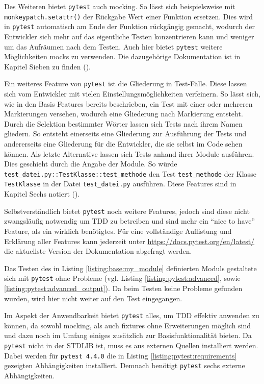 Des Weiteren bietet \lstinline{pytest} auch \gls{mock}ing. So lässt sich
beispielsweise mit \lstinline{monkeypatch.setattr()} der Rückgabe Wert einer
Funktion ersetzen. Dies wird in \lstinline{pytest} automatisch am Ende der
Funktion rückgängig gemacht, wodurch der Entwickler sich mehr auf das
eigentliche Testen konzentrieren kann und weniger um das Aufräumen nach dem
Testen. Auch hier bietet \lstinline{pytest} weitere Möglichkeiten \Glspl{mock}
zu verwenden. Die dazugehörige Dokumentation ist in Kapitel Sieben zu finden
(\cite{docs.pytest.org:4.4}).
\newline

Ein weiteres Feature von \lstinline{pytest} ist die Gliederung in Test-Fälle.
Diese lassen sich vom Entwickler mit vielen Einstellungsmöglichkeiten
verfeinern. So lässt sich, wie in den Basis Features bereits beschrieben, ein
Test mit einer oder mehreren Markierungen versehen, wodurch eine Gliederung nach
Markierung entsteht. Durch die Selektion bestimmter Wörter lassen sich
Tests nach ihrem Namen gliedern. So entsteht einerseits eine Gliederung zur
Ausführung der Tests und andererseits eine Gliederung für die Entwickler, die
sie selbst im Code sehen können. Als letzte Alternative lassen sich Tests anhand
ihrer Module ausführen. Dies geschieht durch die Angabe der Module. So würde
\lstinline{test_datei.py::TestKlasse::test_methode} den Test
\lstinline{test_methode} der Klasse \lstinline{TestKlasse} in der Datei
\lstinline{test_datei.py} ausführen. Diese Features sind in Kapitel Sechs
notiert (\cite{docs.pytest.org:4.4}).
\newline

Selbstverständlich bietet \lstinline{pytest} noch weitere Features, jedoch sind
diese nicht zwangsläufig notwendig um TDD zu betreiben und sind mehr ein "`nice
to have"' Feature, als ein wirklich benötigtes. Für eine vollständige
Auflistung und Erklärung aller Features kann jederzeit unter
\url{https://docs.pytest.org/en/latest/} die aktuellste Version der
Dokumentation abgefragt werden.
\newline

Das Testen des in Listing \ref{listing:base:my_module} definierten Moduls
gestaltete sich mit \lstinline{pytest} ohne Probleme (vgl. Listing
\ref{listing:pytest:advanced}, sowie \ref{listing:pytest:advanced_output}). Da
beim Testen keine Probleme gefunden wurden,  wird hier nicht weiter auf den
Test eingegangen.

Im Aspekt der Anwendbarkeit bietet \lstinline{pytest} alles, um TDD effektiv
anwenden zu können, da sowohl \gls{mock}ing, als auch \Glspl{fixture} ohne
Erweiterungen möglich sind und dazu noch im Umfang einiges zusätzlich zur
Basisfunktionalität bieten. Da \lstinline{pytest} nicht in der STDLIB ist, muss
es aus externen Quellen installiert werden. Dabei werden für
\lstinline{pytest 4.4.0} die in Listing \ref{listing:pytest:requirements}
gezeigten Abhängigkeiten installiert. Demnach benötigt \lstinline{pytest} sechs
externe Abhängigkeiten.

